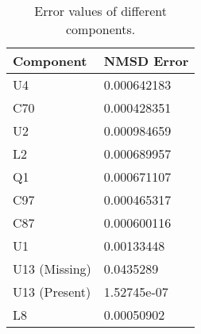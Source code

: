 \documentclass[conference]{IEEEtran}
\begin{document}
\begin{table}[]
\caption{Error values of different components.}
\label{tab:t3error}
\begin{tabular}{|l|l|}
\hline
\textbf{Component} & \textbf{NMSD Error} \\ \hline
U4                 & 0.000642183         \\ \hline
C70                & 0.000428351         \\ \hline
U2                 & 0.000984659         \\ \hline
L2                 & 0.000689957         \\ \hline
Q1                 & 0.000671107         \\ \hline
C97                & 0.000465317         \\ \hline
C87                & 0.000600116         \\ \hline
U1                 & 0.00133448          \\ \hline
U13 (Missing)      & 0.0435289           \\ \hline
U13 (Present)      & 1.52745e-07         \\ \hline
L8                 & 0.00050902          \\ \hline
\end{tabular}
\end{table}


%
%

\end{document}

